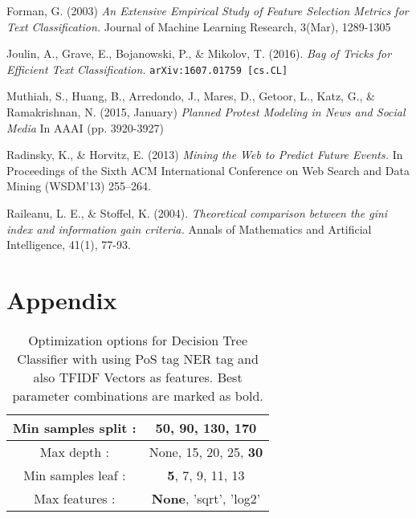 \documentclass{article}
\begin{document}

\begin{thebibliography}{9}

Forman, G. (2003) \textit{An Extensive Empirical Study of Feature Selection Metrics for Text Classification.} Journal of Machine Learning Research, 3(Mar), 1289-1305

Joulin, A., Grave, E., Bojanowski, P., \& Mikolov, T. (2016). \textit{Bag of Tricks for Efficient Text Classification.} \texttt{arXiv:1607.01759 [cs.CL]}

Muthiah, S., Huang, B., Arredondo, J., Mares, D., Getoor, L., Katz, G., \& Ramakrishnan, N. (2015, January) \textit{Planned Protest Modeling in News and Social Media} In AAAI (pp. 3920-3927)

Radinsky, K., \& Horvitz, E. (2013) \textit{Mining the Web to Predict Future Events.}
In Proceedings of the Sixth ACM International Conference on Web Search and Data
Mining (WSDM'13) 255–264.

Raileanu, L. E., \& Stoffel, K. (2004). \textit{Theoretical comparison between the gini index and information gain criteria.} Annals of Mathematics and Artificial Intelligence, 41(1), 77-93.

\appendix

\section{Appendix}
\label{appendix}

\begin{table}
\centering
\begin{tabular}{|c|c|}
\hline
Min samples split : & \textbf{50}, 90, 130, 170 \\
\hline
Max depth : & None, 15, 20, 25, \textbf{30} \\
\hline
Min samples leaf : & \textbf{5}, 7, 9, 11, 13 \\
\hline
Max features : & \textbf{None},  'sqrt', 'log2' \\
\hline
\end{tabular}
\caption{Optimization options for Decision Tree Classifier with using PoS tag NER tag and also TFIDF Vectors as features. Best parameter combinations are marked as bold.}
\label{DecisionTree-opt}
\end{table}




\end{thebibliography}
\end{document}
